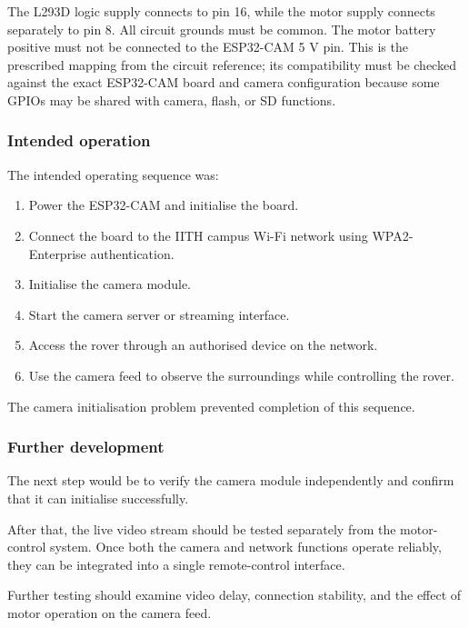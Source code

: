\documentclass[11pt,a4paper]{article}
\begin{document}
The L293D logic supply connects to pin 16, while the motor supply connects separately to pin 8. All circuit grounds must be common. The motor battery positive must not be connected to the ESP32-CAM 5 V pin. This is the prescribed mapping from the circuit reference; its compatibility must be checked against the exact ESP32-CAM board and camera configuration because some GPIOs may be shared with camera, flash, or SD functions.


\subsubsection{Intended operation}

The intended operating sequence was:

\begin{enumerate}
    \item Power the ESP32-CAM and initialise the board.
    \item Connect the board to the IITH campus Wi-Fi
    network using WPA2-Enterprise authentication.
    \item Initialise the camera module.
    \item Start the camera server or streaming interface.
    \item Access the rover through an authorised device
    on the network.
    \item Use the camera feed to observe the surroundings
    while controlling the rover.
\end{enumerate}

The camera initialisation problem prevented
completion of this sequence.


\subsubsection{Further development}

The next step would be to verify the camera module
independently and confirm that it can initialise
successfully.

After that, the live video stream should be tested
separately from the motor-control system. Once
both the camera and network functions operate
reliably, they can be integrated into a single
remote-control interface.

Further testing should examine video delay,
connection stability, and the effect of motor
operation on the camera feed.
\end{document}
